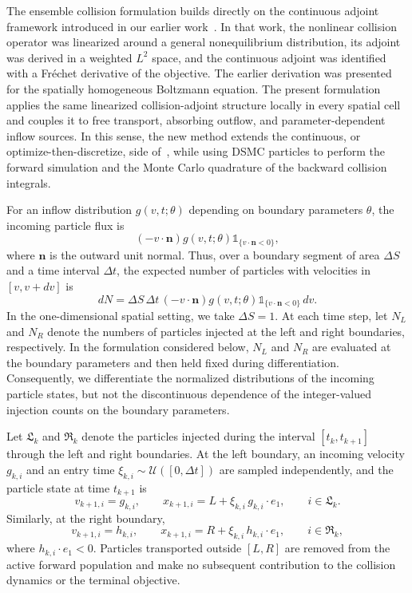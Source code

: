 \documentclass[12pt,nopreprintline]{elsarticle}
\begin{document}
The ensemble collision formulation builds directly on the continuous adjoint framework introduced in our earlier work~\cite{caflisch2021adjoint}. In that work, the nonlinear collision operator was linearized around a general nonequilibrium distribution, its adjoint was derived in a weighted $L^2$ space, and the continuous adjoint was identified with a Fr\'echet derivative of the objective. The earlier derivation was presented for the spatially homogeneous Boltzmann equation. The present formulation applies the same linearized collision-adjoint structure locally in every spatial cell and couples it to free transport, absorbing outflow, and parameter-dependent inflow sources. In this sense, the new method extends the continuous, or optimize-then-discretize, side of~\cite{caflisch2021adjoint}, while using DSMC particles to perform the forward simulation and the Monte Carlo quadrature of the backward collision integrals.

For an inflow distribution $g(v,t;\theta)$ depending on boundary parameters $\theta$, the incoming particle flux is
\[
(-v\cdot\mathbf n)g(v,t;\theta)
\mathds{1}_{\{v\cdot\mathbf n<0\}},
\]
where $\mathbf n$ is the outward unit normal. Thus, over a boundary segment of area $\Delta S$ and a time interval $\Delta t$, the expected number of particles with velocities in $[v,v+dv]$ is
\[
dN =
\Delta S\,\Delta t\,(-v\cdot\mathbf n)g(v,t;\theta)
\mathds{1}_{\{v\cdot\mathbf n<0\}}\,dv.
\]
In the one-dimensional spatial setting, we take $\Delta S=1$. At each time step, let $N_L$ and $N_R$ denote the numbers of particles injected at the left and right boundaries, respectively. In the formulation considered below, $N_L$ and $N_R$ are evaluated at the boundary parameters and then held fixed during differentiation. Consequently, we differentiate the normalized distributions of the incoming particle states, but not the discontinuous dependence of the integer-valued injection counts on the boundary parameters.

Let $\mathfrak L_k$ and $\mathfrak R_k$ denote the particles injected during the interval $[t_k,t_{k+1}]$ through the left and right boundaries. At the left boundary, an incoming velocity $g_{k,i}$ and an entry time $\xi_{k,i}\sim\mathcal U([0,\Delta t])$ are sampled independently, and the particle state at time $t_{k+1}$ is
\begin{equation}
v_{k+1,i}=g_{k,i},
\qquad
x_{k+1,i}=L+\xi_{k,i}\,g_{k,i}\cdot e_1,
\qquad i\in\mathfrak L_k.
\label{eq:ensemble_inflow_left_state}
\end{equation}
Similarly, at the right boundary,
\begin{equation}
v_{k+1,i}=h_{k,i},
\qquad
x_{k+1,i}=R+\xi_{k,i}\,h_{k,i}\cdot e_1,
\qquad i\in\mathfrak R_k,
\label{eq:ensemble_inflow_right_state}
\end{equation}
where $h_{k,i}\cdot e_1<0$. Particles transported outside $[L,R]$ are removed from the active forward population and make no subsequent contribution to the collision dynamics or the terminal objective.
\end{document}
